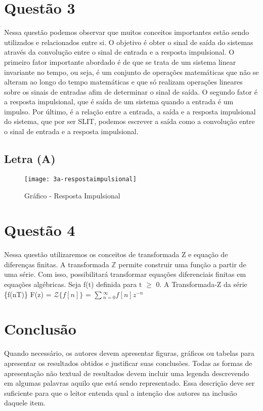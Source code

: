 \documentclass[12pt,a4paper]{report}
\begin{document}
\section{Questão 3}
Nessa questão podemos observar que muitos conceitos importantes estão sendo utilizados e relacionados entre si. O objetivo é obter o sinal de saída do sistemas através da convolução entre o sinal de entrada e a resposta impulsional. O primeiro fator importante abordado é de que se trata de um sistema linear invariante no tempo, ou seja, é um conjunto de operações matemáticas que não se alteram ao longo do tempo matemáticas e que só realizam operações lineares sobre os sinais de entradas afim de determinar o sinal de saída. O segundo fator é a resposta impulsional, que é saída de um sistema quando a entrada é um impulso. Por último, é a relação entre a entrada, a saída e a resposta impulsional do sistema, que por ser SLIT, podemos escrever a saída como a convolução entre o sinal de entrada e a resposta impulsional.
	\subsection{Letra (A)}
		\begin{figure}[!ht]
				\centering
				\texttt{[image: 3a-respostaimpulsional]}
				\caption{Gráfico - Resposta Impulsional}
		\end{figure}

\section{Questão 4}
Nessa questão utilizaremos os conceitos de transformada Z e equação de diferenças finitas. A transformada 
$\mathbb{Z}$ permite construir uma função a partir de uma série. Com isso, possibilitará transformar equações diferenciais finitas em equações algébricas.
Seja f(t) definida para t $\ge$ 0. A Transformada-Z da série \{f(nT)\} 
F(z) = $\mathcal{Z}\{f[n]\}$ = $\sum{_{n=0}^{\infty} f[n] z^{-n}}$

\section{Conclusão}

Quando necessário, os autores devem apresentar figuras, gráficos ou tabelas para apresentar os resultados obtidos e justificar suas conclusões. Todas as formas de apresentação não textual de resultados devem incluir uma legenda descrevendo em algumas palavras aquilo que está sendo representado. Essa descrição deve ser suficiente para que o leitor entenda qual a intenção dos autores na inclusão daquele item.
\end{document}

